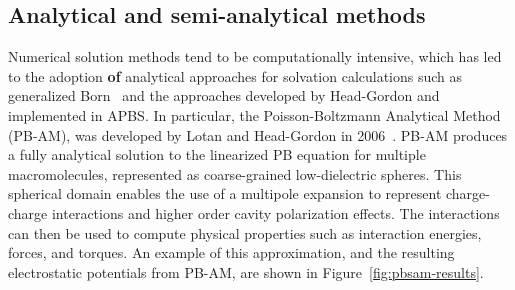 \documentclass[12pt,titlepage]{article}
\newcommand{\revision}[1]{\color{red} \textbf{#1} \leavevmode\color{black}}
\begin{document}
\subsection{Analytical and semi-analytical methods} \label{sec:pbam}
Numerical solution methods tend to be computationally intensive, which has led to the adoption \revision{of} analytical approaches for solvation calculations such as generalized Born~\cite{Bashford2000} and the approaches developed by Head-Gordon and implemented in APBS.
In particular, the Poisson-Boltzmann Analytical Method (PB-AM), was developed by Lotan and Head-Gordon in 2006~\cite{Lotan2006}.
PB-AM produces a fully analytical solution to the linearized PB equation for multiple macromolecules, represented as coarse-grained low-dielectric spheres.
This spherical domain enables the use of a multipole expansion to represent charge-charge interactions and higher order cavity polarization effects.
The interactions can then be used to compute physical properties such as interaction energies, forces, and torques.
An example of this approximation, and the resulting electrostatic potentials from PB-AM, are shown in Figure~\ref{fig:pbsam-results}.
\end{document}
